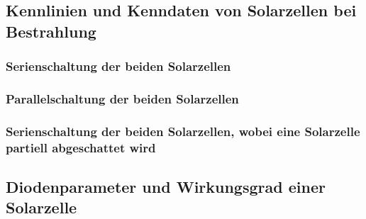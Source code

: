 \documentclass[12pt,english,ngerman]{scrartcl}
\begin{document}
\subsection{Kennlinien und Kenndaten von Solarzellen bei Bestrahlung}

\subsubsection{Serienschaltung der beiden Solarzellen}

\subsubsection{Parallelschaltung der beiden Solarzellen}

\subsubsection{Serienschaltung der beiden Solarzellen, wobei eine Solarzelle partiell abgeschattet wird}

\subsection{Diodenparameter und Wirkungsgrad einer Solarzelle}

\newpage
\printbibliography
\listoffigures
\listoftables
\end{document}
